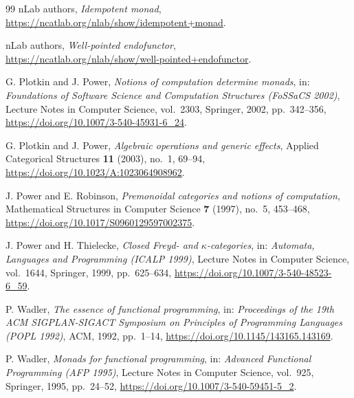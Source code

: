 \documentclass[11pt,a4paper]{article}
\theoremstyle{definition}
\theoremstyle{remark}
\begin{document}
\begin{thebibliography}{99}
nLab authors,
\emph{Idempotent monad}, \\
\url{https://ncatlab.org/nlab/show/idempotent+monad}.

nLab authors,
\emph{Well-pointed endofunctor}, \\
\url{https://ncatlab.org/nlab/show/well-pointed+endofunctor}.

G. Plotkin and J. Power,
\emph{Notions of computation determine monads},
in: \emph{Foundations of Software Science and Computation Structures (FoSSaCS 2002)},
Lecture Notes in Computer Science, vol.~2303, Springer, 2002, pp.~342--356,
\url{https://doi.org/10.1007/3-540-45931-6_24}.

G. Plotkin and J. Power,
\emph{Algebraic operations and generic effects},
Applied Categorical Structures \textbf{11} (2003), no.~1, 69--94,
\url{https://doi.org/10.1023/A:1023064908962}.

J. Power and E. Robinson,
\emph{Premonoidal categories and notions of computation},
Mathematical Structures in Computer Science \textbf{7} (1997), no.~5, 453--468,
\url{https://doi.org/10.1017/S0960129597002375}.

J. Power and H. Thielecke,
\emph{Closed Freyd- and $\kappa$-categories},
in: \emph{Automata, Languages and Programming (ICALP 1999)},
Lecture Notes in Computer Science, vol.~1644, Springer, 1999, pp.~625--634,
\url{https://doi.org/10.1007/3-540-48523-6_59}.

P. Wadler,
\emph{The essence of functional programming},
in: \emph{Proceedings of the 19th ACM SIGPLAN-SIGACT Symposium on Principles of Programming Languages (POPL 1992)},
ACM, 1992, pp.~1--14,
\url{https://doi.org/10.1145/143165.143169}.

P. Wadler,
\emph{Monads for functional programming},
in: \emph{Advanced Functional Programming (AFP 1995)},
Lecture Notes in Computer Science, vol.~925, Springer, 1995, pp.~24--52,
\url{https://doi.org/10.1007/3-540-59451-5_2}.

\end{thebibliography}
\end{document}
